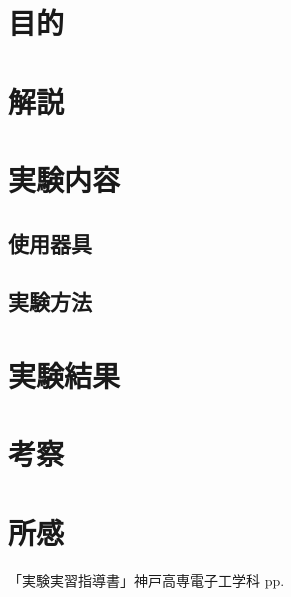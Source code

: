 \documentclass{ltjsarticle}
\title{}
\begin{document}
\maketitle

\section{目的}

\section{解説}
	\subsection{}
\section{実験内容}
	\subsection{使用器具}
	\subsection{実験方法}
\section{実験結果}
\section{考察}
\section{所感}
\begin{thebibliography}{99}
「実験実習指導書」神戸高専電子工学科 pp.
\end{thebibliography}
\end{document}
